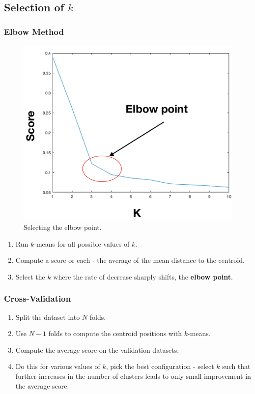 \documentclass[11pt]{article}
\begin{document}
\subsection{Selection of $k$}
\subsubsection{Elbow Method}
\begin{figure}[htb!]
  \centering
  \caption{Selecting the elbow point.}
  \includegraphics[scale=0.3]{elbow}
\end{figure}
\begin{enumerate}
  \item Run $k$-means for all possible values of $k$.
  \item Compute a score or each - the average of the mean distance to the centroid.
  \item Select the $k$ where the rate of decrease sharply shifts, the \textbf{elbow point}.
\end{enumerate}

\subsubsection{Cross-Validation}
\begin{enumerate}
  \item Split the dataset into $N$ folds.
  \item Use $N - 1$ folds to compute the centroid positions with $k$-means.
  \item Compute the average score on the validation datasets.
  \item Do this for various values of $k$, pick the best configuration - select $k$ such that further increases in the number of clusters leads to only small improvement in the average score.
\end{enumerate}
\end{document}
